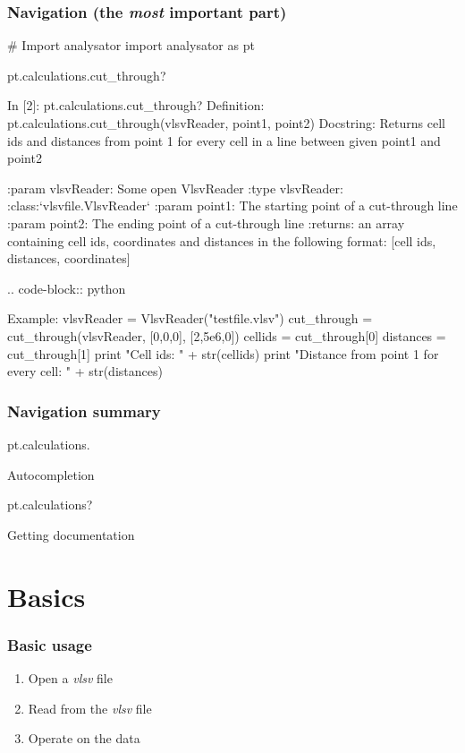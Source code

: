 \documentclass{beamer}
\begin{document}
\begin{frame}[fragile]
 \frametitle{Navigation (the \emph{most} important part)}
 \begin{python}[basicstyle=\tiny]
  # Import analysator
  import analysator as pt
  
  pt.calculations.cut_through?
 \end{python}
 \begin{python}[basicstyle=\tiny]
In [2]: pt.calculations.cut_through?
Definition: pt.calculations.cut_through(vlsvReader, point1, point2)
Docstring:
Returns cell ids and distances from point 1 for every cell in a line between 
given point1 and point2

:param vlsvReader:       Some open VlsvReader
:type vlsvReader:        :class:`vlsvfile.VlsvReader`
:param point1:           The starting point of a cut-through line
:param point2:           The ending point of a cut-through line
:returns: an array containing cell ids, coordinates and distances in the following 
format: [cell ids, distances, coordinates]

.. code-block:: python

   Example:
   vlsvReader = VlsvReader("testfile.vlsv")
   cut_through = cut_through(vlsvReader, [0,0,0], [2,5e6,0])
   cellids = cut_through[0]
   distances = cut_through[1]
   print "Cell ids: " + str(cellids)
   print "Distance from point 1 for every cell: " + str(distances)

 \end{python}
\end{frame}

\begin{frame}[fragile]
 \frametitle{Navigation summary}
 \begin{python}[basicstyle=\tiny]
  pt.calculations.
 \end{python}
  Autocompletion
 \begin{python}[basicstyle=\tiny]
  pt.calculations?
 \end{python}
  Getting documentation
\end{frame}


\section{Basics}

\begin{frame}
 \frametitle{Basic usage}
 \begin{enumerate}
  \item Open a \emph{vlsv} file
  \item Read from the \emph{vlsv} file
  \item Operate on the data
 \end{enumerate}
\end{frame}
\end{document}
